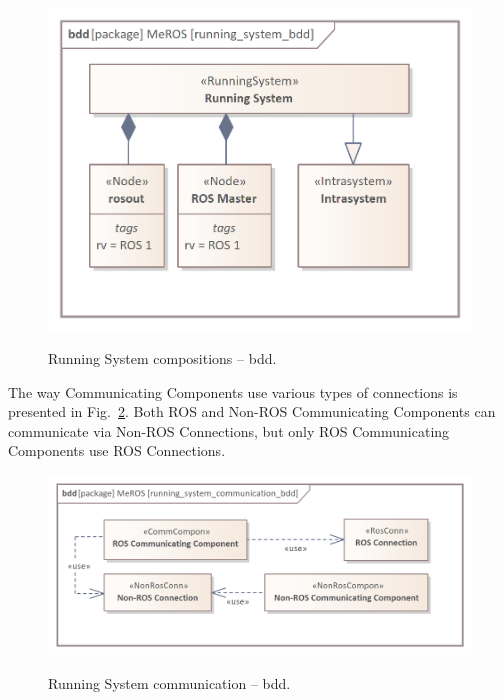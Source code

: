 \documentclass[11pt,oneside,a4paper]{article}
\begin{document}
		
	\begin{figure}[H]
		\centering
		\begin{center}
			{\includegraphics[scale=1.1]{img/meros_pkg/running_system_bdd.png}}
		\end{center}
		\caption{Running System compositions -- bdd.} 
		\label{fig:running_system_bdd}
	\end{figure}
		
	The way Communicating Components use various types of connections is presented in Fig.~\ref{fig:running_system_communication_bdd}. Both ROS and Non-ROS Communicating Components can communicate via Non-ROS Connections, but only ROS Communicating Components use ROS Connections.


	\begin{figure}[H]
		\centering
		\begin{center}
			{\includegraphics[scale=1.1]{img/meros_pkg/running_system_communication_bdd.png}}
		\end{center}
		\caption{Running System communication -- bdd.} 
		\label{fig:running_system_communication_bdd}
	\end{figure}
\end{document}
